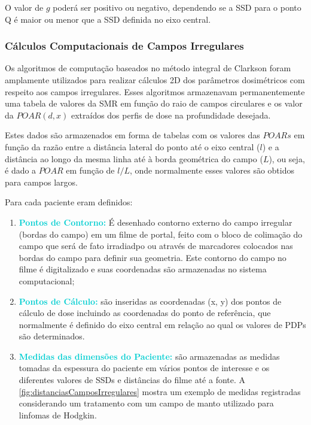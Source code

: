 \documentclass[11pt,a4paper]{article}
\newcounter{exemplo}
\begin{document}
        O valor de $g$ poderá ser positivo ou negativo, dependendo se a SSD para o ponto Q é maior ou menor que a SSD definida no eixo central.


\subsubsection*{Cálculos Computacionais de Campos Irregulares}

        Os algoritmos de computação baseados no método integral de Clarkson foram amplamente utilizados para realizar cálculos 2D dos parâmetros dosimétricos com respeito aos campos irregulares. Esses algoritmos armazenavam permanentemente uma tabela de valores da SMR em função do raio de campos circulares e os valor da $POAR(d, x)$ extraídos dos perfis de dose na profundidade desejada.

        Estes dados são armazenados em forma de tabelas com os valores das $POARs$ em função da razão entre a distância lateral do ponto até o eixo central ($l$) e a distância ao longo da mesma linha até à borda geométrica do campo ($L$), ou seja, é dado a $POAR$ em função de $l/L$, onde normalmente esses valores são obtidos para campos largos.

        Para cada paciente eram definidos:

        \begin{enumerate}[label=\textcolor{CarnationPink}{\roman*.}]
            \item \textcolor{DarkTurquoise}{\textbf{Pontos de Contorno:}} É desenhado contorno externo do campo irregular (bordas do campo) em um filme de portal, feito com o bloco de colimação do campo que será de fato irradiadpo ou através de marcadores colocados nas bordas do campo para definir sua geometria. Este contorno do campo no filme é digitalizado e suas coordenadas são armazenadas no sistema computacional;
            \item \textcolor{DarkTurquoise}{\textbf{Pontos de Cálculo:}} são inseridas as coordenadas (x, y) dos pontos de cálculo de dose incluindo as coordenadas do ponto de referência, que normalmente é definido do eixo central em relação ao qual os valores de PDPs são determinados.
            \item \textcolor{DarkTurquoise}{\textbf{Medidas das dimensões do Paciente:}} são armazenadas as medidas tomadas da espessura do paciente em vários pontos de interesse e os diferentes  valores de SSDs e distâncias do filme até a fonte. A \ref{fig:distanciasCamposIrregulares} mostra um exemplo de medidas registradas considerando um tratamento com um campo de manto utilizado para linfomas de Hodgkin.            
        \end{enumerate}
            
\end{document}
